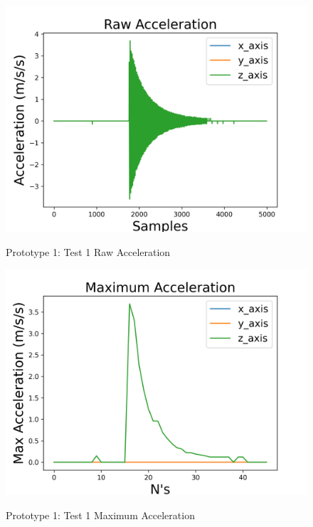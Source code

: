 \begin{figure}[H]
	\centering
	\caption{Prototype 1: Test 1 Raw Acceleration}
	\includegraphics[width=.9\textwidth]{Sections/Prototype-Testing/PosterRA.png}
	\label{proto1-test1-ra}
\end{figure}

\begin{figure}[H]
	\centering
	\caption{Prototype 1: Test 1 Maximum Acceleration}
	\includegraphics[width=.9\textwidth]{Sections/Prototype-Testing/PosterMA.png}
	\label{proto1-test1-ma}
\end{figure}

